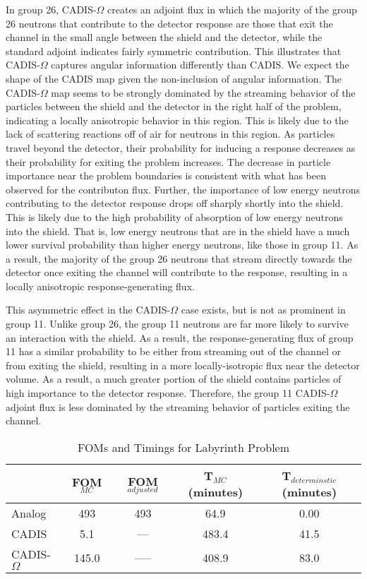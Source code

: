 \documentclass[12pt]{article}
\begin{document}
In group 26, CADIS-$\Omega$ creates an adjoint flux in which the majority of the group 26 neutrons that contribute to the detector response are those that exit the channel in the small angle between the shield and the detector, while the standard adjoint indicates fairly symmetric contribution. 
This illustrates that CADIS-$\Omega$ captures angular information differently than CADIS. 
We expect the shape of the CADIS map given the non-inclusion of angular information. 
The CADIS-$\Omega$ map seems to be strongly dominated by the streaming behavior of the particles between the shield and the detector in the right half of the problem, indicating a locally anisotropic behavior in this region. This is likely due to the lack of scattering reactions off of air for neutrons in this region. As particles travel beyond the detector, their probability for inducing a response decreases as their probability for exiting the problem increases. The decrease in particle importance near the problem boundaries is consistent with what has been observed for the contributon flux. Further, the importance of low energy neutrons contributing to the detector response drops off sharply shortly into the shield. This is likely due to the high probability of absorption of low energy neutrons into the shield. That is, low energy neutrons that are in the shield have a much lower survival probability than higher energy neutrons, like those in group 11. 
As a result, the majority of the group 26 neutrons that stream directly towards the detector once exiting the channel will contribute to the response, resulting in a locally anisotropic response-generating flux. 

This asymmetric effect in the CADIS-$\Omega$ case exists, but is not as prominent in group 11. 
Unlike group 26, the group 11 neutrons are far more likely to survive an interaction with the shield. As a result, the response-generating flux of group 11 has a similar probability to be either from streaming out of the channel or from exiting the shield, resulting in a more locally-isotropic flux near the detector volume. As a result, a much greater portion of the shield contains particles of high importance to the detector response. Therefore, the group 11 CADIS-$\Omega$ adjoint flux is less dominated by the streaming behavior of particles exiting the channel. 

 \begin{table}
  \centering
  \caption{\label{tab:FOMLabI}FOMs and Timings for Labyrinth Problem}
  \begin{tabular}{l|cc|cc}
    \toprule
        & FOM$_{MC}$ & FOM$_{adjusted}$ & T$_{MC}$ (minutes) & T$_{determinstic}$ (minutes) \\
    \hline
    Analog           & 493   &  493     & 64.9      & 0.00 \\ 
    CADIS            & 5.1   &  ---     & 483.4     & 41.5  \\
    CADIS-$\Omega$   & 145.0 &  -----   & 408.9     & 83.0  \\  
	\bottomrule
  \end{tabular}
\end{table}
\end{document}
